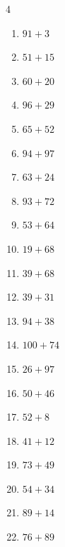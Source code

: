 \begin{multicols}{4}
\begin{enumerate}
  \item $91+3$
        \phantom{$=94$}

  \item $51+15$
        \phantom{$=66$}

  \item $60+20$
        \phantom{$=80$}

  \item $96+29$
        \phantom{$=125$}

  \item $65+52$
        \phantom{$=117$}

  \item $94+97$
        \phantom{$=191$}

  \item $63+24$
        \phantom{$=87$}

  \item $93+72$
        \phantom{$=165$}

  \item $53+64$
        \phantom{$=117$}

  \item $19+68$
        \phantom{$=87$}

  \item $39+68$
        \phantom{$=107$}

  \item $39+31$
        \phantom{$=70$}

  \item $94+38$
        \phantom{$=132$}

  \item $100+74$
        \phantom{$=174$}

  \item $26+97$
        \phantom{$=123$}

  \item $50+46$
        \phantom{$=96$}

  \item $52+8$
        \phantom{$=60$}

  \item $41+12$
        \phantom{$=53$}

  \item $73+49$
        \phantom{$=122$}

  \item $54+34$
        \phantom{$=88$}

  \item $89+14$
        \phantom{$=103$}

  \item $76+89$
        \phantom{$=165$}


\end{enumerate}
\end{multicols}
